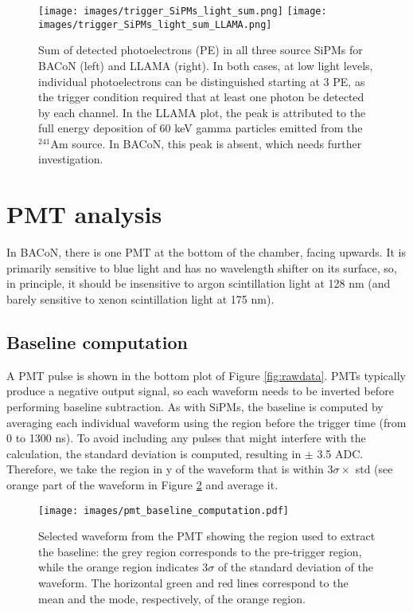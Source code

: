 \documentclass[11pt,a4paper,english,oneside, pdf]{article}
\begin{document}
	\begin{figure}[!h]
		\begin{center}
			\texttt{[image: images/trigger\_SiPMs\_light\_sum.png]}
			\hspace{3mm}
			\texttt{[image: images/trigger\_SiPMs\_light\_sum\_LLAMA.png]}
			\caption{Sum of detected photoelectrons (PE) in all three source SiPMs for BACoN (left) and LLAMA (right). In both cases, at low light levels, individual photoelectrons can be distinguished starting at 3 PE, as the trigger condition required that at least one photon be detected by each channel. In the LLAMA plot, the peak is attributed to the full energy deposition of 60 keV gamma particles emitted from the $^{241}$Am source. In BACoN, this peak is absent, which needs further investigation.}
			\label{fig:sum_detected_pe_trigger_chs}
		\end{center}
	\end{figure}
	
	
	
	\clearpage
	\section{PMT analysis}
	
	In BACoN, there is one PMT at the bottom of the chamber, facing upwards. It is primarily sensitive to blue light and has no wavelength shifter on its surface, so, in principle, it should be insensitive to argon scintillation light at 128 nm (and barely sensitive to xenon scintillation light at 175 nm).
	
	\subsection{Baseline computation}
	
	A PMT pulse is shown in the bottom plot of Figure \ref{fig:rawdata}. PMTs typically produce a negative output signal, so each waveform needs to be inverted before performing baseline subtraction. As with SiPMs, the baseline is computed by averaging each individual waveform using the region before the trigger time (from 0 to 1300 ns). To avoid including any pulses that might interfere with the calculation, the standard deviation is computed, resulting in $\pm$ 3.5 ADC. Therefore, we take the region in y of the waveform that is within 3$\sigma \times$ std (see orange part of the waveform in Figure \ref{fig:pmt_baseline_comp} and average it.
	
		\begin{figure}[!h]
		\begin{center}
			\texttt{[image: images/pmt\_baseline\_computation.pdf]}
			\caption{Selected waveform from the PMT showing the region used to extract the baseline: the grey region corresponds to the pre-trigger region, while the orange region indicates 3$\sigma$ of the standard deviation of the waveform. The horizontal green and red lines correspond to the mean and the mode, respectively, of the orange region.}
			\label{fig:pmt_baseline_comp}
		\end{center}
	\end{figure}
	
\end{document}
